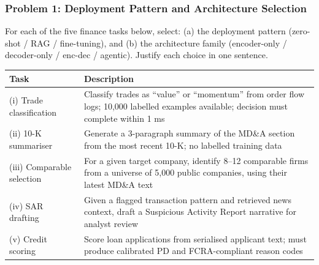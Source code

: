 \documentclass[9pt,t]{beamer}
\begin{document}
\begin{frame}
\frametitle{Problem 1: Deployment Pattern and Architecture Selection}

For each of the five finance tasks below, select: (a) the deployment pattern (zero-shot / RAG / fine-tuning), and (b) the architecture family (encoder-only / decoder-only / enc-dec / agentic). Justify each choice in one sentence.

\medskip
\begin{center}
\scriptsize
\begin{tabular}{lp{6.8cm}}
\toprule
\textbf{Task} & \textbf{Description} \\
\midrule
(i) Trade classification & Classify trades as ``value'' or ``momentum'' from order flow logs; 10,000 labelled examples available; decision must complete within 1 ms \\
(ii) 10-K summariser & Generate a 3-paragraph summary of the MD\&A section from the most recent 10-K; no labelled training data \\
(iii) Comparable selection & For a given target company, identify 8--12 comparable firms from a universe of 5,000 public companies, using their latest MD\&A text \\
(iv) SAR drafting & Given a flagged transaction pattern and retrieved news context, draft a Suspicious Activity Report narrative for analyst review \\
(v) Credit scoring & Score loan applications from serialised applicant text; must produce calibrated PD and FCRA-compliant reason codes \\
\bottomrule
\end{tabular}
\end{center}
\end{frame}
\end{document}
